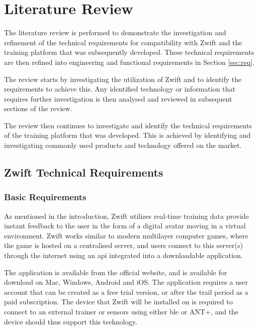 
\chapter{Literature Review}
\label{sec:lit}


The literature review is performed to demonstrate the investigation and refinement of the technical requirements for compatibility with Zwift and the training platform that was subsequently developed. These technical requirements are then refined into engineering and functional requirements in Section \ref{sec:req}.

The review starts by investigating the utilization of Zwift and to identify the requirements to achieve this. Any identified technology or information that requires further investigation is then analysed and reviewed in subsequent sections of the review.

The review then continues to investigate and identify the technical requirements of the training platform that was developed. This is achieved by identifying and investigating commonly used products and technology offered on the market.

\newpage

\section{Zwift Technical Requirements}

\subsection{Basic Requirements}
As mentioned in the introduction, Zwift utilizes real-time training data provide instant feedback to the user in the form of a digital avatar moving in a virtual environment. Zwift works similar to modern multilayer computer games, where the game is hosted on a centralised server, and users connect to this server(s) through the internet using an \ac{api} integrated into a downloadable application.

The application is available from the official website, and is available for download on Mac, Windows, Android and iOS. The application requires a user account that can be created as a free trial version, or after the trail period as a paid subscription. The device that Zwift will be installed on is required to connect to an external trainer or sensors using either \acs{ble} or ANT+, and the device should thus support this technology. \citep{Zwift:2022}

